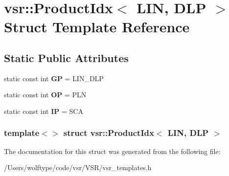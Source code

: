 \hypertarget{structvsr_1_1_product_idx_3_01_l_i_n_00_01_d_l_p_01_4}{\section{vsr\-:\-:Product\-Idx$<$ L\-I\-N, D\-L\-P $>$ Struct Template Reference}
\label{structvsr_1_1_product_idx_3_01_l_i_n_00_01_d_l_p_01_4}
}
\subsection*{Static Public Attributes}
\begin{DoxyCompactItemize}
\item 
\hypertarget{structvsr_1_1_product_idx_3_01_l_i_n_00_01_d_l_p_01_4_a90097e6422844b1a44c4f760bcf9abc5}{static const int {\bfseries G\-P} = L\-I\-N\-\_\-\-D\-L\-P}\label{structvsr_1_1_product_idx_3_01_l_i_n_00_01_d_l_p_01_4_a90097e6422844b1a44c4f760bcf9abc5}

\item 
\hypertarget{structvsr_1_1_product_idx_3_01_l_i_n_00_01_d_l_p_01_4_afc10c2e3cdc94ab2babdc481358fc963}{static const int {\bfseries O\-P} = P\-L\-N}\label{structvsr_1_1_product_idx_3_01_l_i_n_00_01_d_l_p_01_4_afc10c2e3cdc94ab2babdc481358fc963}

\item 
\hypertarget{structvsr_1_1_product_idx_3_01_l_i_n_00_01_d_l_p_01_4_a4734181f84b722fbdfff08ec454f7248}{static const int {\bfseries I\-P} = S\-C\-A}\label{structvsr_1_1_product_idx_3_01_l_i_n_00_01_d_l_p_01_4_a4734181f84b722fbdfff08ec454f7248}

\end{DoxyCompactItemize}
\subsubsection*{template$<$$>$ struct vsr\-::\-Product\-Idx$<$ L\-I\-N, D\-L\-P $>$}



The documentation for this struct was generated from the following file\-:\begin{DoxyCompactItemize}
\item 
/\-Users/wolftype/code/vsr/\-V\-S\-R/vsr\-\_\-templates.\-h\end{DoxyCompactItemize}
